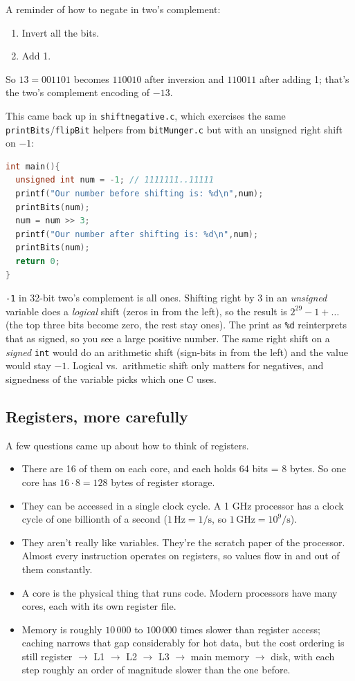 \documentclass[11pt]{article}
\begin{document}
A reminder of how to negate in two's complement:
\begin{enumerate}
  \item Invert all the bits.
  \item Add 1.
\end{enumerate}
So $13 = 001101$ becomes $110010$ after inversion and $110011$ after
adding 1; that's the two's complement encoding of $-13$.

This came back up in \texttt{shiftnegative.c}, which exercises the
same \texttt{printBits}/\texttt{flipBit} helpers from
\texttt{bitMunger.c} but with an unsigned right shift on $-1$:

\begin{lstlisting}[language=C]
int main(){
  unsigned int num = -1; // 1111111..11111
  printf("Our number before shifting is: %d\n",num);
  printBits(num);
  num = num >> 3;
  printf("Our number after shifting is: %d\n",num);
  printBits(num);
  return 0;
}
\end{lstlisting}

\texttt{-1} in 32-bit two's complement is all ones. Shifting right
by 3 in an \emph{unsigned} variable does a \emph{logical} shift (zeros
in from the left), so the result is $2^{29} - 1 + \ldots$ (the top
three bits become zero, the rest stay ones). The print as
\texttt{\%d} reinterprets that as signed, so you see a large positive
number. The same right shift on a \emph{signed} \texttt{int} would do
an arithmetic shift (sign-bits in from the left) and the value would
stay $-1$. Logical vs.\ arithmetic shift only matters for negatives,
and signedness of the variable picks which one C uses.

\subsection*{Registers, more carefully}

A few questions came up about how to think of registers.
\begin{itemize}
  \item There are 16 of them on each core, and each holds 64 bits =
    8 bytes. So one core has $16 \cdot 8 = 128$ bytes of register
    storage.
  \item They can be accessed in a single clock cycle. A 1 GHz
    processor has a clock cycle of one billionth of a second
    ($1\,\text{Hz} = 1/\text{s}$, so $1\,\text{GHz} = 10^9/\text{s}$).
  \item They aren't really like variables. They're the scratch paper
    of the processor. Almost every instruction operates on registers,
    so values flow in and out of them constantly.
  \item A core is the physical thing that runs code. Modern processors
    have many cores, each with its own register file.
  \item Memory is roughly $10\,000$ to $100\,000$ times slower than
    register access; caching narrows that gap considerably for hot
    data, but the cost ordering is still register $\to$ L1 $\to$ L2
    $\to$ L3 $\to$ main memory $\to$ disk, with each step roughly an
    order of magnitude slower than the one before.
\end{itemize}
\end{document}
